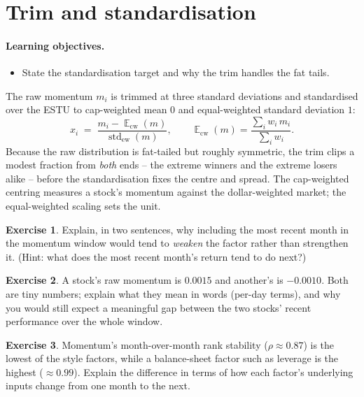 \documentclass[11pt]{article}
\theoremstyle{definition}
\newtheorem{exercise}{Exercise}[section]
\theoremstyle{plain}
\theoremstyle{remark}
\DeclareMathOperator{\std}{std}
\DeclareMathOperator*{\avg}{\mathbb{E}}
\begin{document}
\section{Trim and standardisation}\label{sec:std}

\paragraph{Learning objectives.}
\begin{itemize}[leftmargin=1.4em,topsep=2pt]
  \item State the standardisation target and why the trim handles the fat tails.
\end{itemize}

The raw momentum $m_i$ is trimmed at three standard deviations and standardised over the ESTU to cap-weighted mean $0$ and equal-weighted standard deviation $1$:
\[
x_i \;=\; \frac{m_i - \avg_{\text{cw}}(m)}{\std_{\text{ew}}(m)},
\qquad
\avg_{\text{cw}}(m) = \frac{\sum_i w_i\, m_i}{\sum_i w_i}.
\]
Because the raw distribution is fat-tailed but roughly symmetric, the trim clips a modest fraction from \emph{both} ends -- the extreme winners and the extreme losers alike -- before the standardisation fixes the centre and spread. The cap-weighted centring measures a stock's momentum against the dollar-weighted market; the equal-weighted scaling sets the unit.

\begin{exercise}
Explain, in two sentences, why including the most recent month in the momentum window would tend to \emph{weaken} the factor rather than strengthen it. (Hint: what does the most recent month's return tend to do next?)
\end{exercise}

\begin{exercise}
A stock's raw momentum is $0.0015$ and another's is $-0.0010$. Both are tiny numbers; explain what they mean in words (per-day terms), and why you would still expect a meaningful gap between the two stocks' recent performance over the whole window.
\end{exercise}

\begin{exercise}
Momentum's month-over-month rank stability ($\rho \approx 0.87$) is the lowest of the style factors, while a balance-sheet factor such as leverage is the highest ($\approx 0.99$). Explain the difference in terms of how each factor's underlying inputs change from one month to the next.
\end{exercise}
\end{document}

